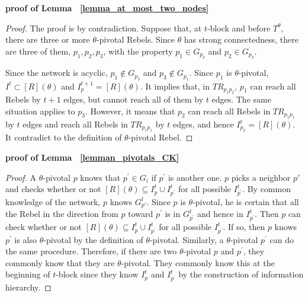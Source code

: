 \documentclass[12pt,letter]{article}
\newtheorem*{lemma*}{Lemma}
\theoremstyle{definition}
\theoremstyle{remark}
\theoremstyle{claim}
\begin{document}
\noindent\textbf{proof of Lemma ~\ref{lemma_at_most_two_nodes}}
   
\begin{proof}
The proof is by contradiction. Suppose that, at $t$-block and before $T^{\theta}$, there are three or more $\theta$-pivotal Rebels. Since $\theta$ has strong connectedness, there are three of them, $p_1,p_2,p_3$, with the property $p_1\in G_{p_2}$ and $p_2 \in G_{p_3}$. 

Since the network is acyclic, $p_1\notin G_{p_3}$ and $p_3\notin G_{p_1}$. Since $p_1$ is $\theta$-pivotal, $I^t\subset [R](\theta)$ and $I^{t+1}_p=[R](\theta)$. It implies that, in $TR_{p_1p_2}$, $p_1$ can reach all Rebels by $t+1$ edges, but cannot reach all of them by $t$ edges. The same situation applies to $p_3$. However, it means that $p_2$ can reach all Rebels in $TR_{p_1p_1}$ by $t$ edges and reach all Rebels in $TR_{p_1p_1}$ by $t$ edges, and hence $I^t_{p_2}=[R](\theta)$. It contradict to the definition of $\theta$-pivotal Rebel.

\end{proof}



\bigskip
\noindent\textbf{proof of Lemma ~\ref{lemman_pivotals_CK}}
\begin{proof}
A $\theta$-pivotal $p$ knows that $p^{'}\in G_i$ if $p^{'}$ is another one. $p$ picks a neighbor $p'$ and checks whether or not $[R](\theta)\subseteq I^t_{p}\cup I^t_{p^{'}}$ for all possible $I^t_{p^{'}}$. By common knowledge of the network, $p$ knows $G^t_{p{'}}$. Since $p$ is $\theta$-pivotal, he is certain that all the Rebel in the direction from $p$ toward $p^{'}$ is in $G^t_{p^{'}}$ and hence in $I^t_{p^{'}}$. Then $p$ can check whether or not $[R](\theta)\subseteq I^t_{p}\cup I^t_{p^{'}}$ for all possible $I^t_{p^{'}}$. If so, then $p$ knows $p^{'}$ is also $\theta$-pivotal by the definition of $\theta$-pivotal. Similarly, a $\theta$-pivotal $p^{'}$ can do the same procedure. Therefore, if there are two $\theta$-pivotal $p$ and $p^{'}$, they commonly know that they are $\theta$-pivotal. They commonly know this at the beginning of $t$-block since they know $I^t_{p}$ and $I^t_{p^{'}}$ by the construction of information hierarchy.
\end{proof}
\end{document}
